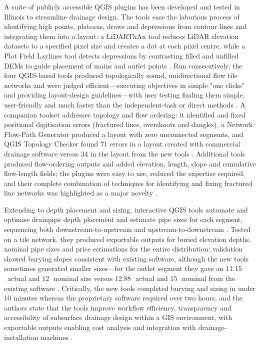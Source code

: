 A suite of publicly accessible QGIS plugins has been developed and tested in Illinois to streamline drainage design. The tools ease the laborious process of identifying high points, plateaus, draws and depressions from contour lines and integrating them into a layout: a LiDARThAn tool reduces LiDAR elevation datasets to a specified pixel size and creates a dot at each pixel centre, while a Plot Field Laylines tool detects depressions by contrasting filled and unfilled DEMs to guide placement of mains and outlet points \parencite{Falasy2025}. Run consecutively, the four QGIS-based tools produced topologically sound, unidirectional flow tile networks and were judged efficient---executing objectives in simple "one clicks" and providing layout-design guidelines---with user testing finding them simple, user-friendly and much faster than the independent-task or direct methods \parencite{Falasy2025}. A companion toolset addresses topology and flow ordering: it identified and fixed positional digitisation errors (fractured lines, overshoots and dangles), a Network Flow-Path Generator produced a layout with zero unconnected segments, and QGIS Topology Checker found 71 errors in a layout created with commercial drainage software versus 34 in the layout from the new tools \parencite{Falasy2024}. Additional tools produced flow-ordering outputs and added elevation, length, slope and cumulative flow-length fields; the plugins were easy to use, reduced the expertise required, and their complete combination of techniques for identifying and fixing fractured line networks was highlighted as a major novelty \parencite{Falasy2024}.

Extending to depth placement and sizing, interactive QGIS tools automate and optimise drainpipe depth placement and estimate pipe sizes for each segment, sequencing both downstream-to-upstream and upstream-to-downstream \parencite{Falasy2025b}. Tested on a tile network, they produced exportable outputs for buried elevation depths, nominal pipe sizes and price estimations for the entire distribution; validation showed burying slopes consistent with existing software, although the new tools sometimes generated smaller sizes---for the outlet segment they gave an 11.15\,\textquotedbl\ actual and 12\,\textquotedbl\ nominal size versus 12.88\,\textquotedbl\ actual and 15\,\textquotedbl\ nominal from the existing software \parencite{Falasy2025b}. Critically, the new tools completed burying and sizing in under 10 minutes whereas the proprietary software required over two hours, and the authors state that the tools improve workflow efficiency, transparency and accessibility of subsurface drainage design within a GIS environment, with exportable outputs enabling cost analysis and integration with drainage-installation machines \parencite{Falasy2025b}.

